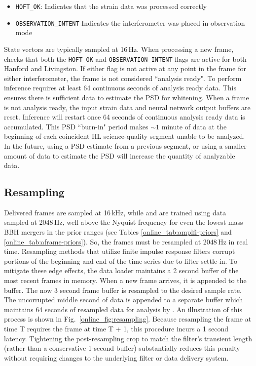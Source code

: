\begin{refsection}
\begin{itemize}
    \item \texttt{HOFT\_OK}: Indicates that the strain data was processed correctly
    \item \texttt{OBSERVATION\_INTENT} Indicates the interferometer was placed in observation mode
\end{itemize}


State vectors are typically sampled at 16\,Hz. 
When processing a new frame, \aframe checks that both the \texttt{HOFT\_OK} and \texttt{OBSERVATION\_INTENT} flags are active for both Hanford and Livingston. 
If either flag is not active at any point in the frame for either interferometer, the frame is not considered ``analysis ready". 
To perform inference \aframe requires at least 64 continuous seconds of analysis ready data. 
This ensures there is sufficient data to estimate the PSD for whitening. 
When a frame is not analysis ready, the input strain data and neural network output buffers are reset. 
Inference will restart once 64 seconds of continuous analysis ready data is accumulated.
This PSD ``burn-in" period makes $\sim 1$ minute of data at the beginning of each coincident HL science-quality segment unable to be analyzed. 
In the future, using a PSD estimate from a previous segment, or using a smaller amount of data to estimate the PSD will increase the quantity of analyzable data. 

\subsection{Resampling}
Delivered frames are sampled at 16\,kHz, while \aframe and \amplfi are trained using data sampled at 2048\,Hz, well above the Nyquist frequency for even the lowest mass BBH mergers in the prior ranges (see Tables \ref{online_tab:amplfi-priors} and \ref{online_tab:aframe-priors}). 
So, the frames must be resampled at 2048\,Hz in real time. 
Resampling methods that utilize finite impulse response filters corrupt portions of the beginning and end of the time-series due to filter settle-in. 
To mitigate these edge effects, the \aframe data loader maintains a 2 second buffer of the most recent frames in memory. 
When a new frame arrives, it is appended to the buffer. The now 3 second frame buffer is resampled to the desired sample rate. 
The uncorrupted middle second of data is appended to a separate buffer which maintains 64 seconds of resampled data for analysis by \aframe. 
An illustration of this process is shown in Fig.~\ref{online_fig:resampling}. 
Because resampling the frame at time T requires the frame at time T + 1, this procedure incurs a 1 second latency.
Tightening the post-resampling crop to match the filter's transient length (rather than a conservative 1-second buffer) substantially reduces this penalty without requiring changes to the underlying filter or data delivery system. 


\end{refsection}
